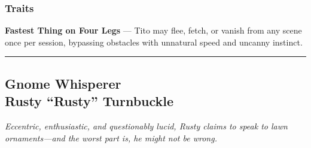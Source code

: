 \begin{paracol}{3}
    \subsubsection{Traits}
      \textbf{Fastest Thing on Four Legs} — Tito may flee, fetch, or vanish from any scene once per session, bypassing obstacles with unnatural speed and uncanny instinct.
\end{paracol}
\vspace{.5\baselineskip}
\hrule
\vspace{.5\baselineskip}

\subsection{{\small Gnome Whisperer}\\ Rusty “Rusty” Turnbuckle}
\label{npc:rusty-turnbuckle}

\emph{Eccentric, enthusiastic, and questionably lucid, Rusty claims to speak to lawn ornaments—and the worst part is, he might not be wrong.}
\vspace{.5\baselineskip}

